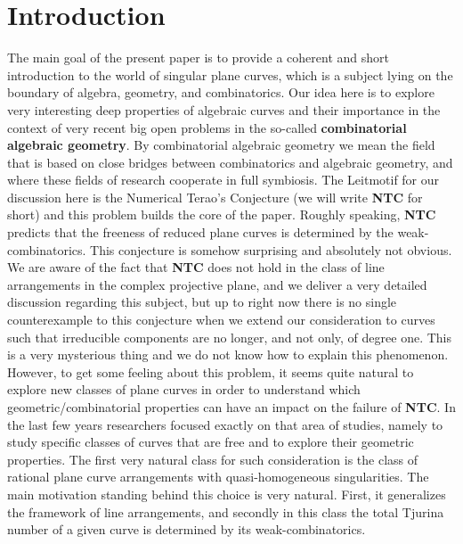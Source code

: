 \documentclass[12pt]{article}
\theoremstyle{plain}
\theoremstyle{definition}
\begin{document}
\section{Introduction}
The main goal of the present paper is to provide a coherent and short introduction to the world of singular plane curves, which is a subject lying on the boundary of algebra, geometry, and combinatorics. Our idea here is to explore very interesting deep properties of algebraic curves and their importance in the context of very recent big open problems in the so-called \textbf{combinatorial algebraic geometry}. By combinatorial algebraic geometry we mean the field that is based on close bridges between combinatorics and algebraic geometry, and where these fields of research cooperate in full symbiosis. The Leitmotif for our discussion here is the Numerical Terao's Conjecture (we will write \textbf{NTC} for short) and this problem builds the core of the paper. Roughly speaking, \textbf{NTC} predicts that the freeness of reduced plane curves is determined by the weak-combinatorics. This conjecture is somehow surprising and absolutely not obvious. We are aware of the fact that \textbf{NTC} does not hold in the class of line arrangements in the complex projective plane, and we deliver a very detailed discussion regarding this subject, but up to right now there is no single counterexample to this conjecture when we extend our consideration to curves such that irreducible components are no longer, and not only, of degree one. This is a very mysterious thing and we do not know how to explain this phenomenon. However, to get some feeling about this problem, it seems quite natural to explore new classes of plane curves in order to understand which geometric/combinatorial properties can have an impact on the failure of \textbf{NTC}. In the last few years researchers focused exactly on that area of studies, namely to study specific classes of curves that are free and to explore their geometric properties. The first very natural class for such consideration is the class of rational plane curve arrangements with quasi-homogeneous singularities. The main motivation standing behind this choice is very natural. First, it generalizes the framework of line arrangements, and secondly in this class the total Tjurina number of a given curve is determined by its weak-combinatorics.
\end{document}
